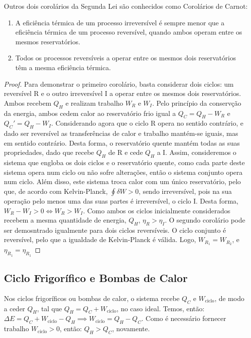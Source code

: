 Outros dois corolários da Segunda Lei são conhecidos como Corolários de Carnot:

\begin{enumerate}
    \item A eficiência térmica de um processo irreversível é sempre menor que a eficiência térmica de um processo reversível, quando ambos operam entre os mesmos reservatórios.
    \item Todos os processos reversíveis a operar entre os mesmos dois reservatórios têm a mesma eficiência térmica.
\end{enumerate}

\begin{proof}
    Para demonstrar o primeiro corolário, basta considerar dois ciclos: um reversível R e o outro irreversível I a operar entre os mesmos dois reservatórios. Ambos recebem $Q_H$ e realizam trabalho $W_R$ e $W_I$. Pelo princípio da conservção da energia, ambos cedem calor ao reservatório frio igual a $Q_C = Q_H - W_R$ e $Q_C' = Q_H - W_I$. Considerando agora que o ciclo R opera no sentido contrário, e dado ser reversível as transferências de calor e trabalho mantém-se iguais, mas em sentido contrário. Desta forma, o reservatório quente mantém todas as suas propriedades, dado que recebe $Q_H$ de R e cede $Q_H$ a I. Assim, consideremos o sistema que engloba os dois ciclos e o reservatório quente, como cada parte deste sistema opera num ciclo ou não sofre alterações, então o sistema conjunto opera num ciclo. Além disso, este sistema troca calor com um único reservatório, pelo que, de acordo com Kelvin-Planck, $\oint \delta W > 0$, sendo irreversível, pois na sua operação pelo menos uma das suas partes é irreversível, o ciclo I. Desta forma, $W_R - W_I > 0 \Longleftrightarrow W_R > W_I$. Como ambos os ciclos inicialmente considerados recebem a mesma quantidade de energia, $Q_H$, $\eta_R > \eta_I$.
    O segundo corolário pode ser demosntrado igualmente para dois ciclos reversíveis. O ciclo conjunto é reversível, pelo que a igualdade de Kelvin-Planck é válida. Logo, $W_{R_1} = W_{R_2}$, e $\eta_{R_1}= \eta_{R_1}$ 
\end{proof}


\subsection{Ciclo Frigorífico e Bombas de Calor}

Nos ciclos frigoríficos ou bombas de calor, o sistema recebe $Q_C$ e $W_{\text{ciclo}}$, de modo a ceder $Q_H$, tal que $Q_H = Q_C + W_{\text{ciclo}}$, no caso ideal. Temos, então: $\Delta E = Q_C + W_{\text{ciclo}} - Q_H \implies W_{\text{ciclo}} = Q_H - Q_C$. Como é necessário fornecer trabalho $W_{\text{ciclo}} > 0$, então: $Q_H > Q_C$, novamente.

